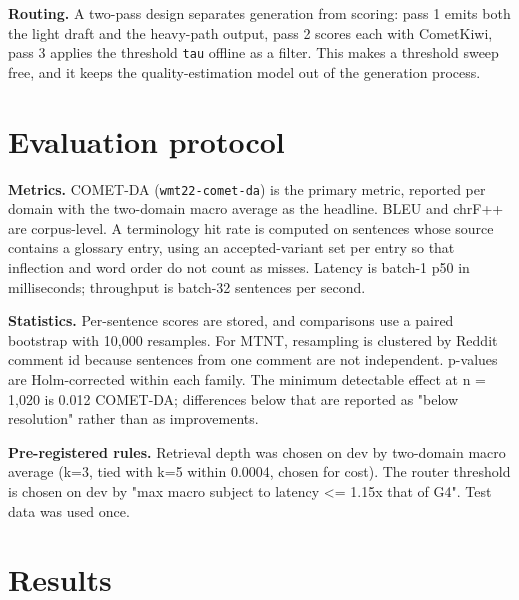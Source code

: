 \documentclass[a4paper,12pt,oneside]{article}
\begin{document}
\textbf{Routing.} A two-pass design separates generation from scoring: pass 1 emits both the light
draft and the heavy-path output, pass 2 scores each with CometKiwi, pass 3 applies the threshold
\texttt{tau} offline as a filter. This makes a threshold sweep free, and it keeps the quality-estimation
model out of the generation process.

\section{Evaluation protocol}

\textbf{Metrics.} COMET-DA (\texttt{wmt22-comet-da}) is the primary metric, reported per domain with the
two-domain macro average as the headline. BLEU and chrF++ are corpus-level. A terminology hit
rate is computed on sentences whose source contains a glossary entry, using an accepted-variant
set per entry so that inflection and word order do not count as misses. Latency is batch-1 p50
in milliseconds; throughput is batch-32 sentences per second.

\textbf{Statistics.} Per-sentence scores are stored, and comparisons use a paired bootstrap with
10,000 resamples. For MTNT, resampling is clustered by Reddit comment id because sentences from
one comment are not independent. p-values are Holm-corrected within each family. The minimum
detectable effect at n = 1,020 is 0.012 COMET-DA; differences below that are reported as
"below resolution" rather than as improvements.

\textbf{Pre-registered rules.} Retrieval depth was chosen on dev by two-domain macro average
(k=3, tied with k=5 within 0.0004, chosen for cost). The router threshold is chosen on dev by
"max macro subject to latency <= 1.15x that of G4". Test data was used once.

\section{Results}
\end{document}
